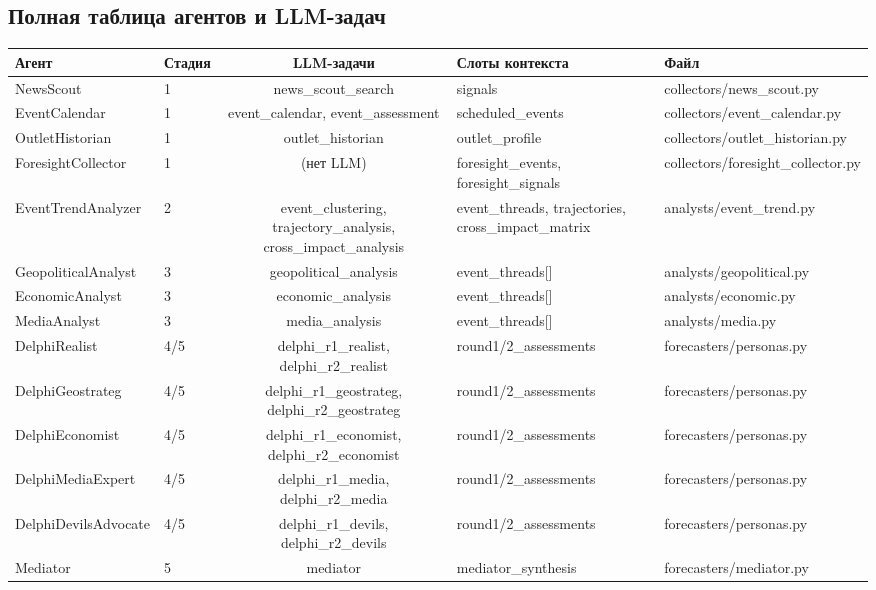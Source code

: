 \subsection{Полная таблица агентов и LLM-задач}


\begin{table}[h]
\centering
\tiny
\begin{tabular}{|l|l|c|l|l|}
\hline
\textbf{Агент} & \textbf{Стадия} & \textbf{LLM-задачи} & \textbf{Слоты контекста} & \textbf{Файл} \\
\hline
NewsScout & 1 & news\_scout\_search & signals & collectors/news\_scout.py \\
EventCalendar & 1 & event\_calendar, event\_assessment & scheduled\_events & collectors/event\_calendar.py \\
OutletHistorian & 1 & outlet\_historian & outlet\_profile & collectors/outlet\_historian.py \\
ForesightCollector & 1 & (нет LLM) & foresight\_events, foresight\_signals & collectors/foresight\_collector.py \\
EventTrendAnalyzer & 2 & event\_clustering, trajectory\_analysis, cross\_impact\_analysis & event\_threads, trajectories, cross\_impact\_matrix & analysts/event\_trend.py \\
GeopoliticalAnalyst & 3 & geopolitical\_analysis & event\_threads[] & analysts/geopolitical.py \\
EconomicAnalyst & 3 & economic\_analysis & event\_threads[] & analysts/economic.py \\
MediaAnalyst & 3 & media\_analysis & event\_threads[] & analysts/media.py \\
DelphiRealist & 4/5 & delphi\_r1\_realist, delphi\_r2\_realist & round1/2\_assessments & forecasters/personas.py \\
DelphiGeostrateg & 4/5 & delphi\_r1\_geostrateg, delphi\_r2\_geostrateg & round1/2\_assessments & forecasters/personas.py \\
DelphiEconomist & 4/5 & delphi\_r1\_economist, delphi\_r2\_economist & round1/2\_assessments & forecasters/personas.py \\
DelphiMediaExpert & 4/5 & delphi\_r1\_media, delphi\_r2\_media & round1/2\_assessments & forecasters/personas.py \\
DelphiDevilsAdvocate & 4/5 & delphi\_r1\_devils, delphi\_r2\_devils & round1/2\_assessments & forecasters/personas.py \\
Mediator & 5 & mediator & mediator\_synthesis & forecasters/mediator.py \\

\end{tabular}
\end{table}
